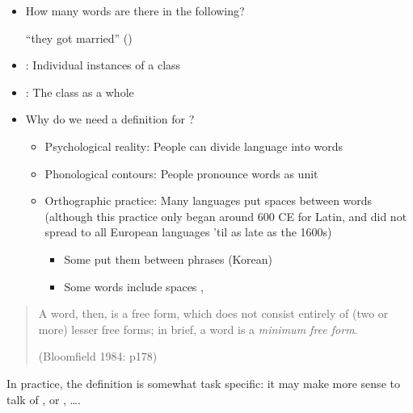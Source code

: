 \documentclass[headrule,footrule]{foils}
\begin{document}

\begin{itemize}
\item How many words are there in the following?
  \begin{exe}
  \ex {}
  \ex {}
  \ex {}
  \ex {} ``they got married'' ()
\end{exe}  

\item {}: Individual instances of a class
\item {}: The class as a whole
\end{itemize}
\newpage
\begin{itemize}
\item  Why do we need a definition for ?
  \begin{itemize}
  \item Psychological reality:  People can divide language into words
  \item Phonological contours:  People pronounce words as unit
  \item Orthographic practice: Many languages put spaces between words
(although this practice only began around 600 CE for Latin, and did
not spread to all European languages 'til as late as the 1600s)
 \begin{itemize}
 \item Some put them between phrases (Korean)
 \item Some words include spaces , 
  \end{itemize}
\end{itemize}
\end{itemize}


\begin{quote}
A word, then, is a free form, which does not consist
entirely of (two or more) lesser free forms; in brief, a
word is a \textit{minimum free form}.
\begin{flushright}
  (Bloomfield 1984: p178) 
\end{flushright}
 \end{quote}

In practice, the definition is somewhat task specific: it may make more sense to talk of ,  or , \ldots .
\end{document}
